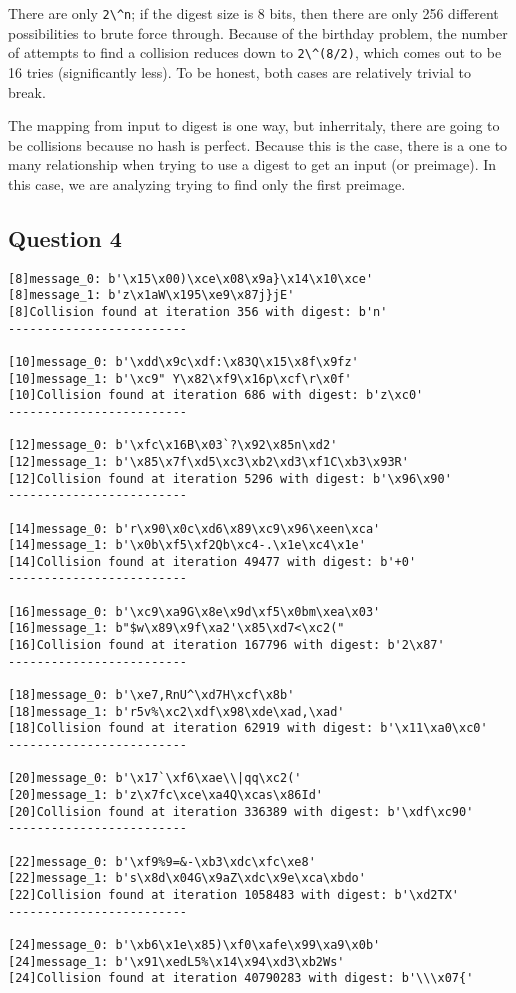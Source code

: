 \documentclass[11pt]{article}
\begin{document}
There are only \verb|2\^n|; if the digest size is 8 bits, then there are only 256 different possibilities to brute force through. Because of the birthday problem, the number of attempts to find a collision reduces down to \verb|2\^(8/2)|, which comes out to be 16 tries (significantly less). To be honest, both cases are relatively trivial to break.

The mapping from input to digest is one way, but inherritaly, there are going to be collisions because no hash is perfect. Because this is the case, there is a one to many relationship when trying to use a digest to get an input (or preimage). In this case, we are analyzing trying to find only the first preimage. 

\subsection*{Question 4}

\begin{lstlisting}
[8]message_0: b'\x15\x00)\xce\x08\x9a}\x14\x10\xce'
[8]message_1: b'z\x1aW\x195\xe9\x87j}jE'
[8]Collision found at iteration 356 with digest: b'n'
-------------------------

[10]message_0: b'\xdd\x9c\xdf:\x83Q\x15\x8f\x9fz'
[10]message_1: b'\xc9" Y\x82\xf9\x16p\xcf\r\x0f'
[10]Collision found at iteration 686 with digest: b'z\xc0'
-------------------------

[12]message_0: b'\xfc\x16B\x03`?\x92\x85n\xd2'
[12]message_1: b'\x85\x7f\xd5\xc3\xb2\xd3\xf1C\xb3\x93R'
[12]Collision found at iteration 5296 with digest: b'\x96\x90'
-------------------------

[14]message_0: b'r\x90\x0c\xd6\x89\xc9\x96\xeen\xca'
[14]message_1: b'\x0b\xf5\xf2Qb\xc4-.\x1e\xc4\x1e'
[14]Collision found at iteration 49477 with digest: b'+0'
-------------------------

[16]message_0: b'\xc9\xa9G\x8e\x9d\xf5\x0bm\xea\x03'
[16]message_1: b"$w\x89\x9f\xa2'\x85\xd7<\xc2("
[16]Collision found at iteration 167796 with digest: b'2\x87'
-------------------------

[18]message_0: b'\xe7,RnU^\xd7H\xcf\x8b'
[18]message_1: b'r5v%\xc2\xdf\x98\xde\xad,\xad'
[18]Collision found at iteration 62919 with digest: b'\x11\xa0\xc0'
-------------------------

[20]message_0: b'\x17`\xf6\xae\\|qq\xc2('
[20]message_1: b'z\x7fc\xce\xa4Q\xcas\x86Id'
[20]Collision found at iteration 336389 with digest: b'\xdf\xc90'
-------------------------

[22]message_0: b'\xf9%9=&-\xb3\xdc\xfc\xe8'
[22]message_1: b's\x8d\x04G\x9aZ\xdc\x9e\xca\xbdo'
[22]Collision found at iteration 1058483 with digest: b'\xd2TX'
-------------------------

[24]message_0: b'\xb6\x1e\x85)\xf0\xafe\x99\xa9\x0b'
[24]message_1: b'\x91\xedL5%\x14\x94\xd3\xb2Ws'
[24]Collision found at iteration 40790283 with digest: b'\\\x07{'

\end{lstlisting}
\end{document}
